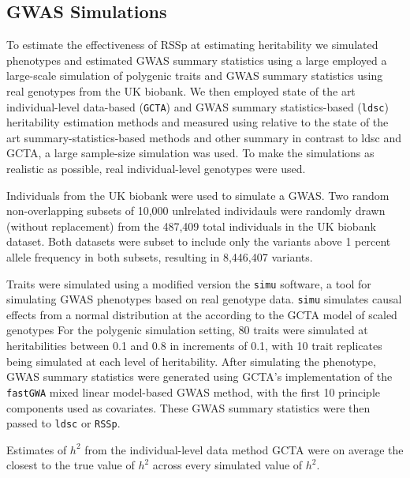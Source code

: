 \subsection{GWAS Simulations}
To estimate the effectiveness of RSSp at estimating heritability we simulated phenotypes and estimated GWAS summary statistics using a large employed a large-scale simulation of polygenic traits and GWAS summary statistics using real genotypes from the UK biobank.  We then employed state of the art individual-level data-based (\texttt{GCTA}\cite{gcta}) and GWAS summary statistics-based (\texttt{ldsc}\cite{ldsc}) heritability estimation methods and measured  using   relative to the state of the art summary-statistics-based methods and  other summary  in contrast to ldsc and GCTA, a large sample-size simulation was used.  To make the simulations as realistic as possible, real individual-level genotypes were used.

Individuals from the UK biobank were used to simulate a GWAS. Two random non-overlapping subsets of 10,000 unlrelated individauls were randomly drawn (without replacement) from the 487,409 total individuals in the UK biobank dataset.  Both datasets were subset to include only the variants above 1 percent allele frequency in both subsets, resulting in 8,446,407 variants.

Traits were simulated using a modified version the \texttt{simu} software\cite{simu}, a tool for simulating GWAS phenotypes based on real genotype data.  \texttt{simu} simulates causal effects from a normal distribution at the according to the GCTA model of scaled genotypes For the polygenic simulation setting, 80 traits were simulated at heritabilities between 0.1 and 0.8 in increments of 0.1, with 10 trait replicates
being simulated at each level of  heritability.  After simulating the phenotype, GWAS summary statistics were generated using GCTA's implementation of the \texttt{fastGWA} mixed linear model-based GWAS method, with the first 10 principle components used as covariates.  These GWAS summary statistics were then passed to \texttt{ldsc} or \texttt{RSSp}.


Estimates of $h^2$ from the individual-level data method GCTA were on average the closest to the true value of $h^2$ across every simulated value of $h^2$. 


